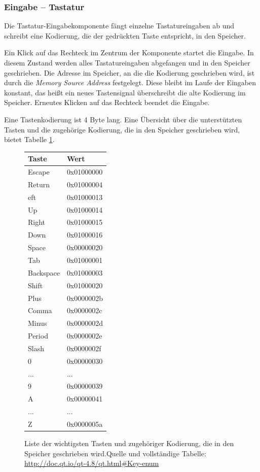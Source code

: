 \subsubsection{Eingabe -- Tastatur}

Die Tastatur-Eingabekomponente fängt einzelne Tastatureingaben ab und schreibt
eine Kodierung, die der gedrückten Taste entspricht, in den Speicher.

Ein Klick auf das Rechteck im Zentrum der Komponente startet die Eingabe. In
diesem Zustand werden alles Tastatureingaben abgefangen und in den Speicher
geschrieben. Die Adresse im Speicher, an die die Kodierung geschrieben wird, ist
durch die \textit{Memory Source Address} festgelegt. Diese bleibt im Laufe der
Eingaben konstant, das heißt ein neues Tastensignal überschreibt die alte
Kodierung im Speicher. Erneutes Klicken auf das Rechteck beendet die Eingabe.

Eine Tastenkodierung ist 4 Byte lang. Eine Übersicht über die unterstützten
Tasten und die zugehörige Kodierung, die in den Speicher geschrieben wird, bietet
Tabelle \ref{tab:keys}.

\begin{figure}
	\centering
	\begin{tabular}{ll}
	\textbf{Taste} & \textbf{Wert} \\
	\hline
	Escape & 0x01000000 \\
	Return & 0x01000004 \\
	eft & 0x01000013 \\
	Up & 0x01000014 \\
	Right & 0x01000015 \\
	Down & 0x01000016 \\
	Space & 0x00000020 \\
	Tab & 0x01000001 \\
	Backspace & 0x01000003 \\
	Shift & 0x01000020 \\
	Plus & 0x0000002b \\
	Comma & 0x0000002c \\
	Minus & 0x0000002d \\
	Period & 0x0000002e \\
	Slash & 0x0000002f \\
	0 & 0x00000030 \\
	... & ... \\
	9 & 0x00000039 \\
	A & 0x00000041 \\
	... & ... \\
	Z & 0x0000005a \\
\end{tabular}
	\caption{Liste der wichtigsten Tasten und zugehöriger Kodierung, die in den
	Speicher geschrieben wird.\newline Quelle und vollständige Tabelle:
	\url{http://doc.qt.io/qt-4.8/qt.html\#Key-enum}}
	\label{tab:keys}
\end{figure}


